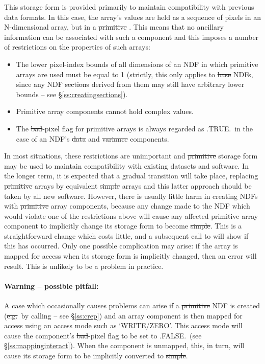 This storage form is provided primarily to maintain compatibility with
previous data formats. 
In this case, the array's values are held as a sequence of pixels in an
N-dimensional array, but in a \st{primitive\/} .
This means that no ancillary information can be associated with such a
component and this imposes a number of restrictions on the properties of
such arrays: 

\begin{itemize}

\item
The lower pixel-index bounds of all dimensions of an NDF in which primitive
arrays are used must be equal to 1 (strictly, this only applies to \st{base\/} NDFs, since any NDF \st{sections\/} derived from them may still have
arbitrary lower bounds -- see \S\ref{ss:creatingsections}). 

\item
Primitive array components cannot hold complex values.

\item
The \st{bad\/}-pixel flag for primitive arrays is always regarded as
.TRUE.\ in the case of an NDF's \st{data\/} and \st{variance\/}
components.

\end{itemize}

In most situations, these restrictions are unimportant and \st{primitive\/}
storage form may be used to maintain compatibility with existing datasets
and software. 
In the longer term, it is expected that a gradual transition will take
place, replacing \st{primitive\/} arrays by equivalent \st{simple\/} arrays
and this latter approach should be taken by all new software.
However, there is usually little harm in creating NDFs with
\st{primitive\/} array components, because any change made to the NDF
which 
would violate one of the restrictions above will cause any affected
\st{primitive\/} array component to implicitly change its storage form
to become 
\st{simple}. 
This is a straightforward change which costs little, and a subsequent call
to  will show if this has occurred. 
Only one possible complication may arise: if the array is mapped for access
when its storage form is implicitly changed, then an error will result. 
This is unlikely to be a problem in practice.

\paragraph{Warning -- possible pitfall:} A case which occasionally causes
problems can arise if a \st{primitive\/} NDF is created (\st{e.g.}\ by
calling  -- see \S\ref{ss:crep}) and an array component is then
mapped for access using an access mode such as `WRITE/ZERO'. 
This access mode will cause the component's \st{bad}-pixel flag to be set
to .FALSE.\ (see \S\ref{ss:mappinginteract}). 
When the component is unmapped, this, in turn, will cause its storage form
to be implicitly converted to \st{simple}. 

